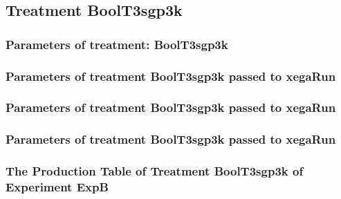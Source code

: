\documentclass[18pt,c]{beamer}
\makeatletter
\def\beamer@writeslidentry@miniframesoff{%
  \expandafter\beamer@ifempty\expandafter{\beamer@framestartpage}{}%
  {%
   \clearpage\beamer@notesactions%
  }
}
\newcommand*{\miniframesoff}{\let\beamer@writeslidentry=\beamer@writeslidentry@miniframesoff}
\makeatother
\begin{document}
\miniframesoff
\subsection{Treatment BoolT3sgp3k}

 \begin{frame}
 \fontsize{8pt}{9pt}\selectfont
 \frametitle{  Parameters of treatment: BoolT3sgp3k 
 }

 \label{ExpBtParmTable064.tex}  
 \end{frame}


 \begin{frame}
 \fontsize{8pt}{9pt}\selectfont
 \frametitle{  Parameters of treatment BoolT3sgp3k passed to xegaRun
 }

 \label{ExpBtParmTable065.tex}  
 \end{frame}


 \begin{frame}
 \fontsize{8pt}{9pt}\selectfont
 \frametitle{  Parameters of treatment BoolT3sgp3k passed to xegaRun
 }

 \label{ExpBtParmTable066.tex}  
 \end{frame}


 \begin{frame}
 \fontsize{8pt}{9pt}\selectfont
 \frametitle{  Parameters of treatment BoolT3sgp3k passed to xegaRun
 }

 \label{ExpBtParmTable067.tex}  
 \end{frame}

 \begin{frame}
 \fontsize{8pt}{9pt}\selectfont
 \frametitle{ The Production Table of Treatment BoolT3sgp3k of Experiment ExpB }

 \label{ExpBGrammarTable019.tex}  
 \end{frame}
\end{document}
